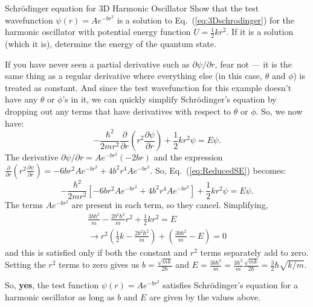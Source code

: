 \begin{example}{Schr\"{o}dinger equation for 3D Harmonic Oscillator}
Show that the test wavefunction $\psi(r) = Ae^{-br^2}$ is a solution
to Eq.~(\ref{eq:3Dschrodinger}) for the harmonic oscillator with
potential energy function $U =\frac{1}{2}kr^2$. If it is a solution
(which it is), determine the energy of the quantum state.

\begin{solution}
If you have never seen a partial derivative such as
$\partial \psi/\partial r$, fear not --- it is the same thing as a
regular derivative where everything else (in this case, $\theta$ and
$\phi$) is treated as constant.  And since the test wavefunction for
this example doesn't have any $\theta$ or $\phi$'s in it, we can
quickly simplify Schr\"{o}dinger's equation by dropping out any terms
that have derivatives with respect to $\theta$ or $\phi$. So, we now
have:
\begin{equation}
-\frac{\hbar^2}{2mr^2} \frac{\partial}{\partial r} \left( r^2
\frac{\partial \psi}{\partial r} \right) + \frac{1}{2}kr^2 \psi = E
\psi.
\label{eq:ReducedSE}
\end{equation}
The derivative $\partial \psi/\partial r = Ae^{-br^2}(-2br)$ and the
expression $\frac{\partial}{\partial r}(r^2\frac{\partial
  \psi}{\partial r}) = -6br^2Ae^{-br^2} +4b^2r^4Ae^{-br^2}$. So,
Eq.~(\ref{eq:ReducedSE}) becomes:
\begin{equation}
-\frac{\hbar^2}{2mr^2} \left[-6br^2Ae^{-br^2}+4b^2r^4Ae^{-br^2}\right]
+ \frac{1}{2}kr^2 \psi = E \psi.
\end{equation}
The terms $Ae^{-br^2}$ are present in each term, so they
cancel. Simplifying,
\begin{align}
\frac{3b\hbar^2}{m} - \frac{2b^2\hbar^2}{m}r^2 + \frac{1}{2}kr^2 =
E\\ \rightarrow r^2\left(\frac{1}{2}k-\frac{2b^2\hbar^2}{m}\right) +
\left(\frac{3b\hbar^2}{m} - E\right) = 0
\end{align}
and this is satisfied only if both the constant and $r^2$ terms
separately add to zero.  Setting the $r^2$ terms to zero gives us $b =
\frac{\sqrt{mk}}{2\hbar}$ and $E = \frac{3b\hbar^2}{m} =
\frac{3\hbar^2}{m}\frac{\sqrt{mk}}{2\hbar} =
\frac{3}{2}\hbar\sqrt{k/m}$.

So, {\bf yes}, the test function $\psi(r) = Ae^{-br^2}$ satisfies
Schr\"{o}dinger's equation for a harmonic oscillator as long as $b$
and $E$ are given by the values above.
\end{solution}
\end{example}

